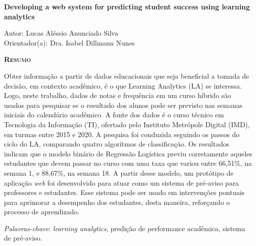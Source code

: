 \begin{center}
	{\Large{\textbf{Developing a web system for predicting student success using learning analytics}}}
\end{center}

\vspace{1cm}

\begin{flushright}
	Autor: Lucas Aléssio Anunciado Silva\\
	Orientador(a): Dra. Isabel Dillmann Nunes
\end{flushright}

\vspace{1cm}

\begin{center}
	\Large{\textsc{\textbf{Resumo}}}
\end{center}

\noindent Obter informação a partir de dados educacionais que seja beneficial a tomada de decisão, em contexto acadêmico, é o que Learning Analytics (LA) se interessa. Logo, neste trabalho, dados de notas e frequência em um curso híbrido são usados para pesquisar se o resultado dos alunos pode ser previsto nas semanas iniciais do calendário acadêmico. A fonte dos dados é o curso técnico em Tecnologia da Informação (TI), ofertado pelo Instituto Metrópole Digital (IMD), em turmas entre 2015 e 2020. A pesquisa foi conduzida seguindo os passos do ciclo do LA, comparando quatro algoritmos de classificação. Os resultados indicam que o modelo binário de Regressão Logística previu corretamente aqueles estudantes que devem passar no curso com uma taxa que variou entre 66,51\%, na semana 1, e 88,67\%, na semana 18. A partir desse modelo, um protótipo de aplicação \emph{web} foi desenvolvido para atuar como um sistema de pré-aviso para professores e estudantes. Esse sistema pode ser usado em intervenções pontuais para aprimorar a desempenho dos estudantes, desta maneira, reforçando o processo de aprendizado.

\noindent\textit{Palavras-chave}: \emph{learning analytics}, predição de performance acadêmica, sistema de pré-aviso.
